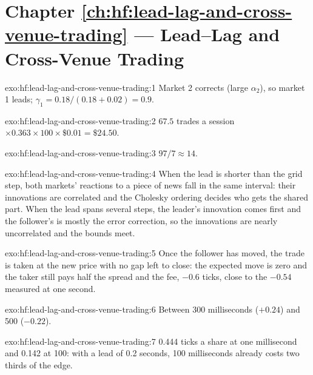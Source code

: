 \section*{Chapter \ref{ch:hf:lead-lag-and-cross-venue-trading} --- Lead--Lag and Cross-Venue Trading}

\begin{solution}{exo:hf:lead-lag-and-cross-venue-trading:1}
Market 2 corrects (large $\alpha_2$), so market 1 leads; $\gamma_1=0.18/(0.18+0.02)=0.9$.
\end{solution}

\begin{solution}{exo:hf:lead-lag-and-cross-venue-trading:2}
$67.5$ trades a session $\times0.363\times100\times\$0.01=\$24.50$.
\end{solution}

\begin{solution}{exo:hf:lead-lag-and-cross-venue-trading:3}
$97/7\approx14$.
\end{solution}

\begin{solution}{exo:hf:lead-lag-and-cross-venue-trading:4}
When the lead is shorter than the grid step, both markets' reactions to a piece of news fall in the same interval: their innovations are
correlated and the Cholesky ordering decides who gets the shared part. When the lead spans several steps, the leader's innovation comes first and
the follower's is mostly the error correction, so the innovations are nearly uncorrelated and the bounds meet.
\end{solution}

\begin{solution}{exo:hf:lead-lag-and-cross-venue-trading:5}
Once the follower has moved, the trade is taken at the new price with no gap left to close: the expected move is zero and the taker still pays half
the spread and the fee, $-0.6$ ticks, close to the $-0.54$ measured at one second.
\end{solution}

\begin{solution}{exo:hf:lead-lag-and-cross-venue-trading:6}
Between 300 milliseconds ($+0.24$) and 500 ($-0.22$).
\end{solution}

\begin{solution}{exo:hf:lead-lag-and-cross-venue-trading:7}
0.444 ticks a share at one millisecond and 0.142 at 100: with a lead of 0.2 seconds, 100 milliseconds already costs two thirds of the edge.
\end{solution}

